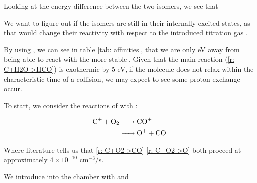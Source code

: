Looking at the energy difference between the two isomers, we see that 

We want to figure out if the \ce{[HCO]+} isomers are still in their internally excited states, as that would change their reactivity with respect to the introduced titration gas .

By using , we can see in table \ref{tab: affinities}, that we are only  eV away from being able to react with the more stable . Given that the main reaction (\ref{r: C+H2O->HCO}) is exothermic by 5 eV, if the molecule does not relax within the characteristic time of a collision, we may expect to see some proton exchange occur.

To start, we consider the reactions of  with :

\begin{align}
	\ce{C+ + O2 & -> CO+} \label{r: C+O2->CO} \\
	\ce{& -> O+ + CO} \label{r: C+O2->O}
\end{align}

Where literature tells us that \ref{r: C+O2->CO} \ref{r: C+O2->O} both proceed at approximately $4 \times 10^{-10}$ cm$^{-3}$/s.

We introduce  into the chamber with  and 